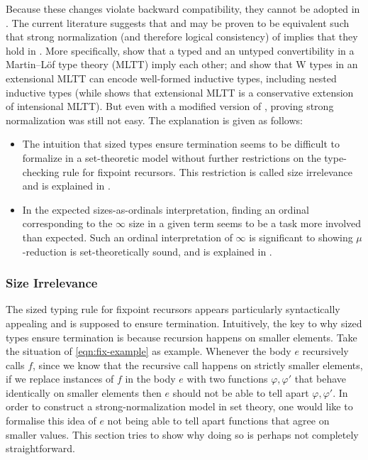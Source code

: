 Because these changes violate backward compatibility, they cannot be adopted in \lang.
%
The current literature suggests that \langAnother and \lang may be
proven to be equivalent such that strong normalization (and therefore
logical consistency) of \langAnother implies that they hold in \lang.
More specifically, \cite{conversion} show that a typed and an untyped
convertibility in a Martin--L\"of type theory (MLTT) imply each other;
and \citet{w-types, polynomial-functors-w} show that W types in an
extensional MLTT can encode well-formed inductive types, including
nested inductive types (while \citet{hofmann} shows that extensional
MLTT is a conservative extension of intensional MLTT).
%
But even with a modified version of \lang, proving strong
normalization was still not easy.
%
The explanation is given as follows:
%
\begin{itemize}
  \item The intuition that sized types ensure termination seems to be
  difficult to formalize in a set-theoretic model without further
  restrictions on the type-checking rule for fixpoint recursors.
  This restriction is called size irrelevance and is explained in
  .
  \item In the expected sizes-as-ordinals interpretation, finding an
  ordinal corresponding to the $\infty$ size in a given term seems to
  be a task more involved than expected.
  Such an ordinal interpretation of $\infty$ is significant to showing
  $\mu$-reduction is set-theoretically sound, and is explained in
  .
\end{itemize}

\subsubsection{Size Irrelevance}\label{sec:size-irrel}
%
The sized typing rule for fixpoint recursors appears particularly
syntactically appealing and is supposed to ensure termination.
%
Intuitively, the key to why sized types ensure termination is because
recursion happens on smaller elements.
%
Take the situation of \eqref{eqn:fix-example} as example.
%
Whenever the body $e$ recursively calls $f$, since we know that the
recursive call happens on strictly smaller elements, if we replace
instances of $f$ in the body $e$ with two functions $\varphi,\varphi'$
that behave identically on smaller elements then $e$ should not be
able to tell apart $\varphi,\varphi'$.
%
In order to construct a strong-normalization model in set theory, one
would like to formalise this idea of $e$ not being able to tell apart
functions that agree on smaller values.
%
This section tries to show why doing so is perhaps not completely
straightforward.

